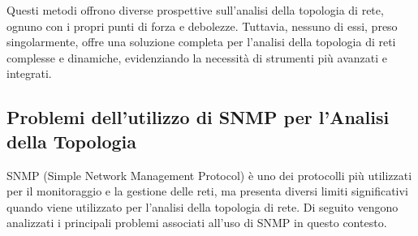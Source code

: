 \documentclass[target=bach,aauheader=,style=]{thud}
\begin{document}
\noindent Questi metodi offrono diverse prospettive sull'analisi della topologia di rete, ognuno con i propri punti di forza e debolezze. Tuttavia, nessuno di essi, preso singolarmente, offre una soluzione completa per l'analisi della topologia di reti complesse e dinamiche, evidenziando la necessità di strumenti più avanzati e integrati.

\subsection{Problemi dell'utilizzo di SNMP per l'Analisi della Topologia}
SNMP (Simple Network Management Protocol) è uno dei protocolli più utilizzati per il monitoraggio e la gestione delle reti, ma presenta diversi limiti significativi quando viene utilizzato per l'analisi della topologia di rete. Di seguito vengono analizzati i principali problemi associati all'uso di SNMP in questo contesto.
\end{document}
